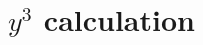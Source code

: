 \documentclass[11pt, a4paper]{report}
\begin{document}
\section{\texttt{$y^3$} calculation}
\end{document}
